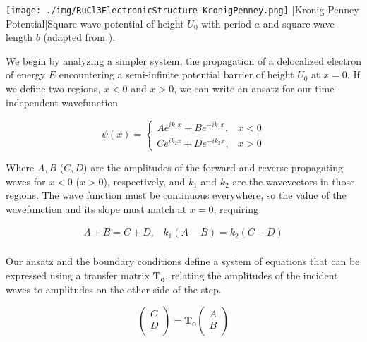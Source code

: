 \begin{centering}
\texttt{[image: ./img/RuCl3ElectronicStructure-KronigPenney.png]}
  \captionsetup{width=0.75\textwidth}
  [Kronig-Penney Potential]{Square wave potential of height $U_{0}$ with period $a$ and square wave length $b$ (adapted from \cite{Erez2014}).} 
  \label{fig:RuCl3ElecStruct-1}
\end{centering}

We begin by analyzing a simpler system, the propagation of a delocalized electron of energy $E$ encountering a semi-infinite potential barrier of height $U_{0}$ at $x = 0$. If we define two regions, $x <0$ and $x>0$, we can write an ansatz for our time-independent wavefunction

\begin{equation}
\psi(x) =
	\begin{cases}
	A e^{i k_{1} x} + B e^{-i k_{1} x}, & x < 0 \\
	C e^{i k_{2} x} + D e^{-i k_{2} x}, & x > 0
	\end{cases}
\end{equation}
	
Where $A,B$ ($C,D$) are the amplitudes of the forward and reverse propagating waves for $x<0$ ($x>0$), respectively, and $k_{1}$ and $k_{2}$ are the wavevectors in those regions. The wave function must be continuous everywhere, so the value of the wavefunction and its slope must match at $x = 0$, requiring

\begin{equation}
	\begin{array}{cc}
		A + B = C + D, & k_{1}(A - B) = k_{2}(C - D) \\
	\end{array}
\end{equation}

Our ansatz and the boundary conditions define a system of equations that can be expressed using a transfer matrix $\mathbf{T_{0}}$, relating the amplitudes of the incident waves to amplitudes on the other side of the step.

\begin{equation}
	\begin{pmatrix}
		C \\
		D \\
	\end{pmatrix} =
	\mathbf{T_{0}}
	\begin{pmatrix}
		A \\
		B \\
	\end{pmatrix}
\end{equation}

